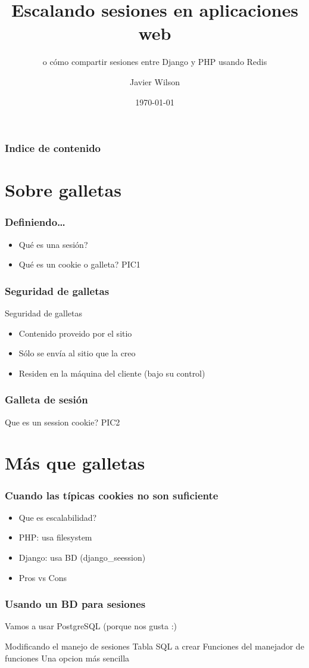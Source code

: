 \documentclass{beamer}
\begin{document}
\title{Escalando sesiones en aplicaciones web}
\subtitle{o cómo compartir sesiones entre Django y PHP usando Redis}
\author{Javier Wilson}
\date{\today} 

\begin{frame}
\titlepage
\end{frame}

\begin{frame}\frametitle{Indice de contenido}\tableofcontents
\end{frame} 


\section{Sobre galletas} 
\begin{frame}\frametitle{Definiendo\ldots}
\begin{itemize}
\item Qué es una sesión? \pause
\item Qué es un cookie o galleta? PIC1 \pause
\end{itemize} 
\end{frame}

\begin{frame}\frametitle{Seguridad de galletas}
Seguridad de galletas\pause
\begin{itemize}
\item Contenido proveido por el sitio \pause
\item Sólo se envía al sitio que la creo \pause
\item Residen en la máquina del cliente (bajo su control)
\end{itemize} 

\end{frame}

\begin{frame}\frametitle{Galleta de sesión}
Que es un session cookie?
PIC2
\end{frame}

\section{Más que galletas} 
\begin{frame}\frametitle{Cuando las típicas cookies no son suficiente}
\begin{itemize}
\item Que es escalabilidad? \pause
\item PHP: usa filesystem \pause
\item Django: usa BD (django_seession) \pause
\item Pros vs Cons
\end{itemize} 
\end{frame}

\begin{frame}\frametitle{Usando un BD para sesiones}
Vamos a usar PostgreSQL (porque nos gusta :)
\begin{itemize}
Modificando el manejo de sesiones
Tabla SQL a crear
Funciones del manejador de funciones
Una opcion más sencilla
\end{itemize} 

\end{frame}
\end{document}
